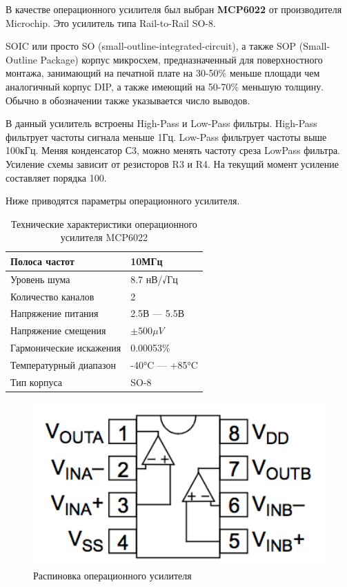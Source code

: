 В качестве операционного усилителя был выбран \textbf{MCP6022} от производителя Microchip. Это усилитель типа Rail-to-Rail SO-8.

SOIC или просто SO (small-outline-integrated-circuit), а также SOP (Small-Outline Package) корпус микросхем, предназначенный для поверхностного монтажа, занимающий на печатной плате на 30-50\% меньше площади чем аналогичный корпус DIP, а также имеющий на 50-70\% меньшую толщину. Обычно в обозначении также указывается число выводов.

В данный усилитель встроены High-Pass и Low-Pass фильтры. High-Pass фильтрует частоты сигнала меньше 1Гц. Low-Pass фильтрует частоты выше 100кГц. Меняя конденсатор С3, можно менять частоту среза LowPass фильтра. Усиление схемы зависит от резисторов R3 и R4. На текущий момент усиление составляет порядка 100.

Ниже приводятся параметры операционного усилителя.

\begin{table}[h]
\centering
\label{my-label}
\begin{tabular}{|l|l|}
\hline
Полоса частот                  & 10МГц                      \\ \hline
Уровень шума                   & 8.7 нВ/√Гц                 \\ \hline
Количество каналов             & 2                          \\ \hline
Напряжение питания             & 2.5В --- 5.5В              \\ \hline
Напряжение смещения            & $\pm500\mu V $             \\ \hline
Гармонические искажения        & 0.00053\%                  \\ \hline
Температурный диапазон         & -40°C --- +85°C            \\ \hline
Тип корпуса                    & SO-8                       \\ \hline
\end{tabular}
\caption{Технические характеристики операционного усилителя MCP6022}
\end{table}

\begin{figure}[H]
\centering
\includegraphics[width=12cm]{op-amp.png}
\caption{Распиновка операционного усилителя}
\end{figure}


